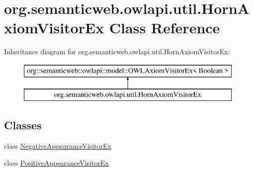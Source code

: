 \hypertarget{classorg_1_1semanticweb_1_1owlapi_1_1util_1_1_horn_axiom_visitor_ex}{\section{org.\-semanticweb.\-owlapi.\-util.\-Horn\-Axiom\-Visitor\-Ex Class Reference}
\label{classorg_1_1semanticweb_1_1owlapi_1_1util_1_1_horn_axiom_visitor_ex}
}
Inheritance diagram for org.\-semanticweb.\-owlapi.\-util.\-Horn\-Axiom\-Visitor\-Ex\-:\begin{figure}[H]
\begin{center}
\leavevmode
\includegraphics[height=2.000000cm]{classorg_1_1semanticweb_1_1owlapi_1_1util_1_1_horn_axiom_visitor_ex}
\end{center}
\end{figure}
\subsection*{Classes}
\begin{DoxyCompactItemize}
\item 
class \hyperlink{classorg_1_1semanticweb_1_1owlapi_1_1util_1_1_horn_axiom_visitor_ex_1_1_negative_appearance_visitor_ex}{Negative\-Appearance\-Visitor\-Ex}
\item 
class \hyperlink{classorg_1_1semanticweb_1_1owlapi_1_1util_1_1_horn_axiom_visitor_ex_1_1_positive_appearance_visitor_ex}{Positive\-Appearance\-Visitor\-Ex}
\end{DoxyCompactItemize}
